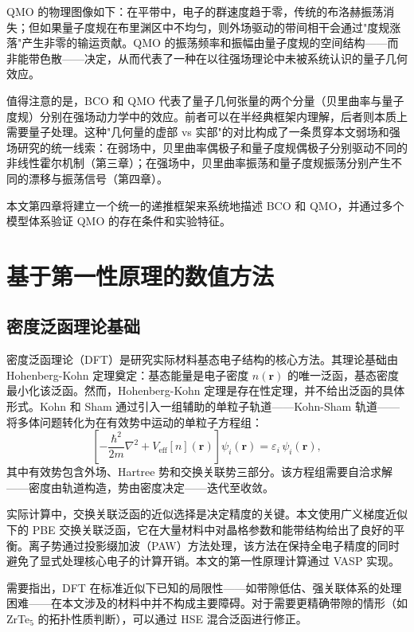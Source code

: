 QMO 的物理图像如下：在平带中，电子的群速度趋于零，传统的布洛赫振荡消失；但如果量子度规在布里渊区中不均匀，则外场驱动的带间相干会通过"度规涨落"产生非零的输运贡献。QMO 的振荡频率和振幅由量子度规的空间结构——而非能带色散——决定，从而代表了一种在以往强场理论中未被系统认识的量子几何效应。

值得注意的是，BCO 和 QMO 代表了量子几何张量的两个分量（贝里曲率与量子度规）分别在强场动力学中的效应。前者可以在半经典框架内理解，后者则本质上需要量子处理。这种"几何量的虚部 vs 实部"的对比构成了一条贯穿本文弱场和强场研究的统一线索：在弱场中，贝里曲率偶极子和量子度规偶极子分别驱动不同的非线性霍尔机制（第三章）；在强场中，贝里曲率振荡和量子度规振荡分别产生不同的漂移与振荡信号（第四章）。

本文第四章将建立一个统一的递推框架来系统地描述 BCO 和 QMO，并通过多个模型体系验证 QMO 的存在条件和实验特征。


\section{基于第一性原理的数值方法}
\label{sec:first-principles}

\subsection{密度泛函理论基础}

密度泛函理论（DFT）是研究实际材料基态电子结构的核心方法。其理论基础由 Hohenberg-Kohn 定理奠定：基态能量是电子密度 $n(\bm{r})$ 的唯一泛函，基态密度最小化该泛函。然而，Hohenberg-Kohn 定理是存在性定理，并不给出泛函的具体形式。Kohn 和 Sham 通过引入一组辅助的单粒子轨道——Kohn-Sham 轨道——将多体问题转化为在有效势中运动的单粒子方程组：
\begin{equation}
  \left[ -\frac{\hbar^2}{2m}\nabla^2 + V_\mathrm{eff}[n](\bm{r}) \right] \psi_i(\bm{r}) = \varepsilon_i \, \psi_i(\bm{r}),
\end{equation}
其中有效势包含外场、Hartree 势和交换关联势三部分。该方程组需要自洽求解——密度由轨道构造，势由密度决定——迭代至收敛。

实际计算中，交换关联泛函的近似选择是决定精度的关键。本文使用广义梯度近似下的 PBE 交换关联泛函\cite{perdew_generalized_1996}，它在大量材料中对晶格参数和能带结构给出了良好的平衡。离子势通过投影缀加波（PAW）方法处理\cite{PAW_method,blochl_projector_1994}，该方法在保持全电子精度的同时避免了显式处理核心电子的计算开销。本文的第一性原理计算通过 VASP 实现\cite{vasp1,vasp2}。

需要指出，DFT 在标准近似下已知的局限性——如带隙低估、强关联体系的处理困难——在本文涉及的材料中并不构成主要障碍。对于需要更精确带隙的情形（如 ZrTe$_5$ 的拓扑性质判断），可以通过 HSE 混合泛函\cite{heyd2003}进行修正。

